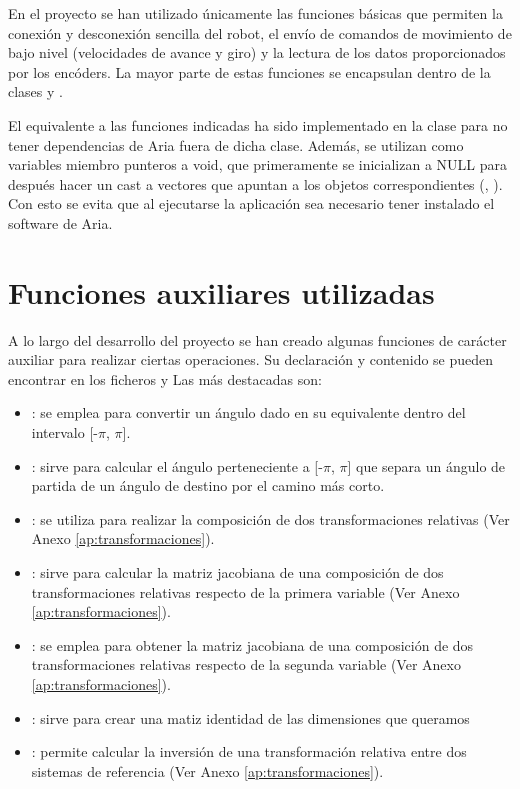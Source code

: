 En el proyecto se han utilizado únicamente las funciones básicas que permiten la conexión y desconexión sencilla del robot, el envío de comandos de movimiento de bajo nivel (velocidades de avance y giro) y la lectura de los datos proporcionados por los encóders. La mayor parte de estas funciones se encapsulan dentro de la clases  y .

El equivalente a las funciones indicadas ha sido implementado en la clase  para no tener dependencias de Aria fuera de dicha clase.
Además, se utilizan como variables miembro punteros a void, que primeramente se inicializan a NULL para después hacer un cast a vectores que apuntan a los objetos correspondientes (, ). Con esto se evita que al ejecutarse la aplicación sea necesario tener instalado el software de Aria.

\section{Funciones auxiliares utilizadas}
A lo largo del desarrollo del proyecto se han creado algunas funciones de carácter auxiliar para realizar ciertas operaciones. Su declaración y contenido se pueden encontrar en los ficheros  y  Las más destacadas son:

\begin{itemize}
  \item {}: se emplea para convertir un ángulo dado en su equivalente dentro del intervalo
   [-$\pi$, $\pi$].
  \item {}: sirve para calcular el ángulo perteneciente a [-$\pi$, $\pi$] que separa un ángulo de partida de un ángulo de destino por el camino más corto.
  \item {}: se utiliza para realizar la composición de dos transformaciones relativas (Ver Anexo \ref{ap:transformaciones}).
  \item {}: sirve para calcular la matriz jacobiana de una composición de dos transformaciones relativas respecto de la primera variable  (Ver Anexo \ref{ap:transformaciones}).
  \item {}: se emplea para obtener la matriz jacobiana de una composición de dos transformaciones relativas respecto de la segunda variable  (Ver Anexo \ref{ap:transformaciones}).
  \item {}: sirve para crear una matiz identidad de las dimensiones que queramos
  \item {}: permite calcular la inversión de una transformación relativa entre dos sistemas de referencia  (Ver Anexo \ref{ap:transformaciones}).
\end{itemize}

